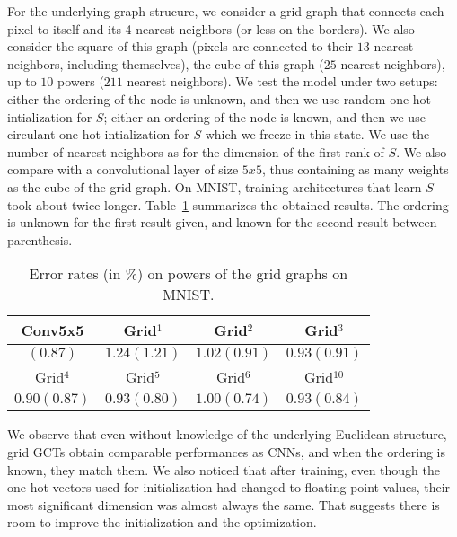 For the underlying graph strucure, we consider a grid graph that connects each pixel to itself and its 4 nearest neighbors (or less on the borders). We also consider the square of this graph (pixels are connected to their $13$ nearest neighbors, including themselves), the cube of this graph ($25$ nearest neighbors), up to $10$ powers ($211$ nearest neighbors).
We test the model under two setups: either the ordering of the node is unknown, and then we use random one-hot intialization for $S$; either an ordering of the node is known, and then we use circulant one-hot intialization for $S$ which we freeze in this state. We use the number of nearest neighbors as for the dimension of the first rank of $S$.
We also compare with a convolutional layer of size $5x5$, thus containing as many weights as the cube of the grid graph. On MNIST, training architectures that learn $S$ took about twice longer. Table~\ref{toy} summarizes the obtained results. The ordering is unknown for the first result given, and known for the second result between parenthesis.

\begin{table}[H]
  \caption{Error rates (in \%) on powers of the grid graphs on MNIST.}
  \begin{center}
    \bgroup
    \def\arraystretch{1.5}%
    \begin{tabular}{|c|c|c|c|}
      \hline
      Conv5x5 & Grid$^1$ & Grid$^2$ & Grid$^3$\\
      \hline
      $(0.87)$ & $1.24 (1.21)$ & $1.02 (0.91)$ & $0.93 (0.91)$\\
      \hline
      \hline
      Grid$^4$ & Grid$^5$ & Grid$^6$ & Grid$^{10}$\\
      \hline
      $0.90 (0.87)$ & $0.93 (0.80)$ & $1.00 (0.74)$ & $0.93 (0.84)$\\
      \hline
    \end{tabular}
    \egroup
  \end{center}
  \label{toy}
\end{table}

We observe that even without knowledge of the underlying Euclidean structure, grid GCTs obtain comparable performances as CNNs, and when the ordering is known, they match them. We also noticed that after training, even though the one-hot vectors used for initialization had changed to floating point values, their most significant dimension was almost always the same. That suggests there is room to improve the initialization and the optimization.

